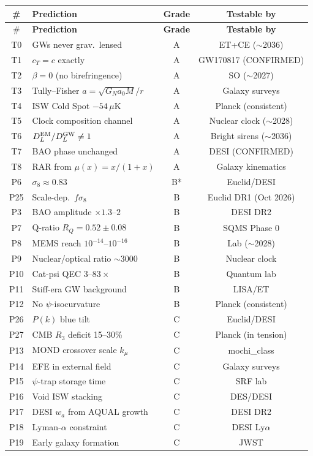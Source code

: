 \documentclass[11pt]{article}
\newcommand{\aM}{a_0}
\begin{document}
\begin{tcolorbox}[colback=blue!5!white, colframe=blue!70!black,
  title=\textbf{W4i22 TOP 5 FINDINGS --- PREDICTIONS TEAM}]
\begin{enumerate}
  \begin{longtable}{clcc}
  \toprule
  \# & \textbf{Prediction} & \textbf{Grade} & \textbf{Testable by} \\
  \midrule
  \endfirsthead
  \toprule
  \# & \textbf{Prediction} & \textbf{Grade} & \textbf{Testable by} \\
  \midrule
  \endhead
  T0 & GWs never grav.\ lensed & A & ET+CE ($\sim$2036) \\
  T1 & $c_T = c$ exactly & A & GW170817 (CONFIRMED) \\
  T2 & $\beta = 0$ (no birefringence) & A & SO ($\sim$2027) \\
  T3 & Tully--Fisher $a = \sqrt{G_N\aM M}/r$ & A & Galaxy surveys \\
  T4 & ISW Cold Spot $-54\,\mu$K & A & Planck (consistent) \\
  T5 & Clock composition channel & A & Nuclear clock ($\sim$2028) \\
  T6 & $D_L^{\rm EM}/D_L^{\rm GW} \neq 1$ & A & Bright sirens ($\sim$2036) \\
  T7 & BAO phase unchanged & A & DESI (CONFIRMED) \\
  T8 & RAR from $\mu(x) = x/(1+x)$ & A & Galaxy kinematics \\
  P6 & $\sigma_8 \approx 0.83$ & B* & Euclid/DESI \\
  P25 & Scale-dep.\ $f\sigma_8$ & B & Euclid DR1 (Oct 2026) \\
  P3 & BAO amplitude $\times 1.3$--$2$ & B & DESI DR2 \\
  P7 & Q-ratio $R_Q = 0.52 \pm 0.08$ & B & SQMS Phase 0 \\
  P8 & MEMS reach $10^{-14}$--$10^{-16}$ & B & Lab ($\sim$2028) \\
  P9 & Nuclear/optical ratio $\sim 3000$ & B & Nuclear clock \\
  P10 & Cat-psi QEC $3$--$83\times$ & B & Quantum lab \\
  P11 & Stiff-era GW background & B & LISA/ET \\
  P12 & No $\psi$-isocurvature & B & Planck (consistent) \\
  P26 & $P(k)$ blue tilt & C & Euclid/DESI \\
  P27 & CMB $R_3$ deficit 15--30\% & C & Planck (in tension) \\
  P13 & MOND crossover scale $k_\mu$ & C & mochi\_class \\
  P14 & EFE in external field & C & Galaxy surveys \\
  P15 & $\psi$-trap storage time & C & SRF lab \\
  P16 & Void ISW stacking & C & DES/DESI \\
  P17 & DESI $w_a$ from AQUAL growth & C & DESI DR2 \\
  P18 & Lyman-$\alpha$ constraint & C & DESI Ly$\alpha$ \\
  P19 & Early galaxy formation & C & JWST \\
  \bottomrule
  \end{longtable}


\end{enumerate}
\end{tcolorbox}
\end{document}
